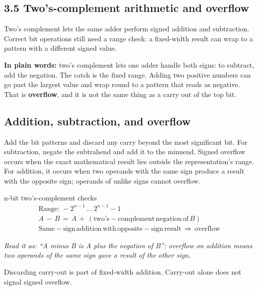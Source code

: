 \documentclass[11pt]{article}
\begin{document}
\begin{keepsection}
\section{3.5 Two’s-complement arithmetic and overflow}

Two’s complement lets the same adder perform signed addition and subtraction. Correct bit operations still need a range check: a fixed-width result can wrap to a pattern with a different signed value.

\begin{plainbox}\textbf{In plain words:} two’s complement lets one adder handle both signs: to subtract, add the negation. The catch is the fixed range. Adding two positive numbers can go past the largest value and wrap round to a pattern that reads as negative. That is \textbf{overflow}, and it is not the same thing as a carry out of the top bit.\end{plainbox}

\begin{keepsection}
\subsection{Addition, subtraction, and overflow}

Add the bit patterns and discard any carry beyond the most significant bit. For subtraction, negate the subtrahend and add it to the minuend. Signed overflow occurs when the exact mathematical result lies outside the representation’s range. For addition, it occurs when two operands with the same sign produce a result with the opposite sign; operands of unlike signs cannot overflow.

\begin{equationcard}{n-bit two’s-complement checks}
\[ \begin{gathered} \text{Range}:\, -2^{{n}-1}\, …\, 2^{{n}-1}-1 \\ {A}\, -\, {B}\, =\, {A}\, +\, (\text{two}’\mathrm{s}-\text{complement}\, \text{negation}\, \text{of}\, {B}) \\ \text{Same}-\text{sign}\, \text{addition}\, \text{with}\, \text{opposite}-\text{sign}\, \text{result}\, \Rightarrow \, \text{overflow} \end{gathered} \]
{\small \emph{Read it as: “A minus B is A plus the negation of B”; overflow on addition means two operands of the same sign gave a result of the other sign.}\par Discarding carry-out is part of fixed-width addition. Carry-out alone does not signal signed overflow.}
\end{equationcard}


\end{keepsection}
\end{keepsection}
\end{document}
